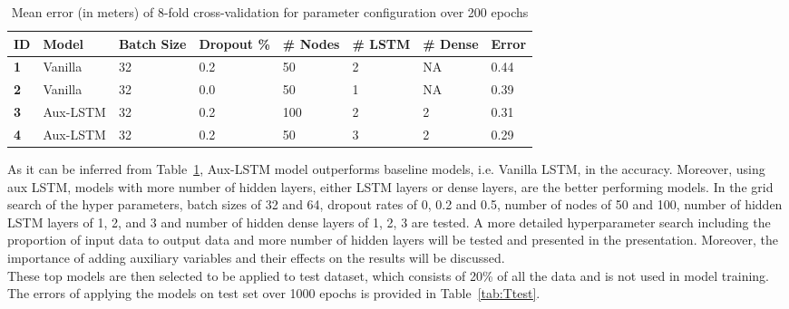 \begin{table}[ht]

    \caption{Mean error (in meters) of 8-fold cross-validation for parameter configuration over 200 epochs}
    \centering
    \small\addtolength{\tabcolsep}{-3pt}
    \begin{tabular}{|l|l|l|l|l|l|l|l|}
    \hline
       \textbf{ID} & \textbf{Model} & \textbf{Batch Size} & \textbf{Dropout \%} & \textbf{\# Nodes} & \textbf{\# LSTM} & \textbf{\# Dense}  & \textbf{Error} \\
       \hline
    
         \textbf{1} & Vanilla & 32 & 0.2 & 50 & 2 & NA & 0.44 \\
         \textbf{2} & Vanilla & 32 & 0.0 & 50 & 1 & NA & 0.39\\
         \textbf{3} & Aux-LSTM & 32 & 0.2 & 100 & 2 & 2 & 0.31\\
         \textbf{4} & Aux-LSTM & 32 & 0.2 & 50 & 3 & 2 & 0.29\\
    \hline
    \end{tabular}
    \label{tab:Tacc}
\end{table}
As it can be inferred from Table~\ref{tab:Tacc}, Aux-LSTM model outperforms baseline models, i.e. Vanilla LSTM, in the accuracy. Moreover, using aux LSTM, models with more number of hidden layers, either LSTM layers or dense layers, are the better performing models. In the grid search of the hyper parameters, batch sizes of 32 and 64, dropout rates of 0, 0.2 and 0.5, number of nodes of 50 and 100, number of hidden LSTM layers of 1, 2, and 3 and number of hidden dense layers of 1, 2, 3 are tested. A more detailed hyperparameter search including the proportion of input data to output data and more number of hidden layers will be tested and presented in the presentation. Moreover, the importance of adding auxiliary variables and their effects on the results will be discussed. \\
These top models are then selected to be applied to test dataset, which consists of 20\% of all the data and is not used in model training. The errors of applying the models on test set over 1000 epochs is provided in Table~\ref{tab:Ttest}.

